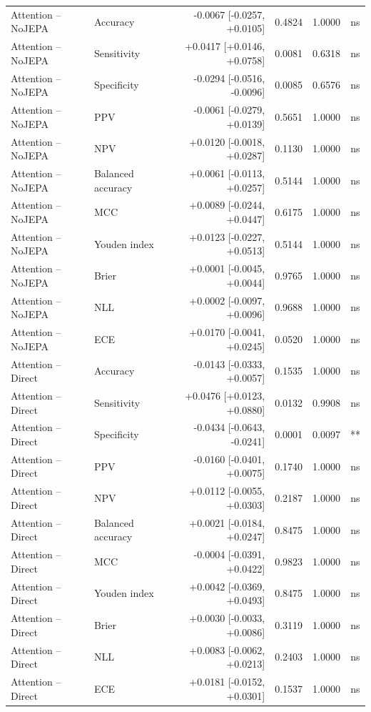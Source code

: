 \begin{table}[t]
\begin{tabular}{llrrrc}
Attention -- NoJEPA & Accuracy & -0.0067 [-0.0257, +0.0105] & 0.4824 & 1.0000 & ns \\
Attention -- NoJEPA & Sensitivity & +0.0417 [+0.0146, +0.0758] & 0.0081 & 0.6318 & ns \\
Attention -- NoJEPA & Specificity & -0.0294 [-0.0516, -0.0096] & 0.0085 & 0.6576 & ns \\
Attention -- NoJEPA & PPV & -0.0061 [-0.0279, +0.0139] & 0.5651 & 1.0000 & ns \\
Attention -- NoJEPA & NPV & +0.0120 [-0.0018, +0.0287] & 0.1130 & 1.0000 & ns \\
Attention -- NoJEPA & Balanced accuracy & +0.0061 [-0.0113, +0.0257] & 0.5144 & 1.0000 & ns \\
Attention -- NoJEPA & MCC & +0.0089 [-0.0244, +0.0447] & 0.6175 & 1.0000 & ns \\
Attention -- NoJEPA & Youden index & +0.0123 [-0.0227, +0.0513] & 0.5144 & 1.0000 & ns \\
Attention -- NoJEPA & Brier & +0.0001 [-0.0045, +0.0044] & 0.9765 & 1.0000 & ns \\
Attention -- NoJEPA & NLL & +0.0002 [-0.0097, +0.0096] & 0.9688 & 1.0000 & ns \\
Attention -- NoJEPA & ECE & +0.0170 [-0.0041, +0.0245] & 0.0520 & 1.0000 & ns \\
Attention -- Direct & Accuracy & -0.0143 [-0.0333, +0.0057] & 0.1535 & 1.0000 & ns \\
Attention -- Direct & Sensitivity & +0.0476 [+0.0123, +0.0880] & 0.0132 & 0.9908 & ns \\
Attention -- Direct & Specificity & -0.0434 [-0.0643, -0.0241] & 0.0001 & 0.0097 & ** \\
Attention -- Direct & PPV & -0.0160 [-0.0401, +0.0075] & 0.1740 & 1.0000 & ns \\
Attention -- Direct & NPV & +0.0112 [-0.0055, +0.0303] & 0.2187 & 1.0000 & ns \\
Attention -- Direct & Balanced accuracy & +0.0021 [-0.0184, +0.0247] & 0.8475 & 1.0000 & ns \\
Attention -- Direct & MCC & -0.0004 [-0.0391, +0.0422] & 0.9823 & 1.0000 & ns \\
Attention -- Direct & Youden index & +0.0042 [-0.0369, +0.0493] & 0.8475 & 1.0000 & ns \\
Attention -- Direct & Brier & +0.0030 [-0.0033, +0.0086] & 0.3119 & 1.0000 & ns \\
Attention -- Direct & NLL & +0.0083 [-0.0062, +0.0213] & 0.2403 & 1.0000 & ns \\
Attention -- Direct & ECE & +0.0181 [-0.0152, +0.0301] & 0.1537 & 1.0000 & ns \\
\bottomrule
\end{tabular}
\end{table}
